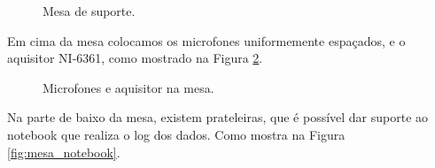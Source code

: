 \documentclass[a4paper,oneside,12pt]{article}
\begin{document}
\begin{figure}
\centering
{}
\caption{Mesa de suporte.}\label{fig:mesa}
\end{figure}

Em cima da mesa colocamos os microfones uniformemente espaçados, e o aquisitor NI-6361, como mostrado na Figura \ref{fig:mesa_microfone}.

\begin{figure}
\centering
{}
\caption{Microfones e aquisitor na mesa.}\label{fig:mesa_microfone}
\end{figure}

Na parte de baixo da mesa, existem prateleiras, que é possível dar suporte ao notebook que realiza o log dos dados. Como mostra na Figura \ref{fig:mesa_notebook}.
\end{document}
